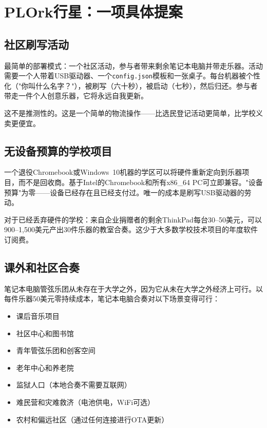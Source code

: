 \documentclass[10pt,letterpaper,twocolumn]{article}
\begin{document}
\section{PLOrk行星：一项具体提案}
\label{sec:proposal}

\subsection{社区刷写活动}

最简单的部署模式：一个社区活动，参与者带来剩余笔记本电脑并带走乐器。活动需要一个人带着USB驱动器、一个\texttt{config.json}模板和一张桌子。每台机器被个性化（"你叫什么名字？"），被刷写（六十秒），被启动（七秒），然后归还。参与者带走一件个人创意乐器，它将永远自我更新。

这不是推测性的。这是一个简单的物流操作——比选民登记活动更简单，比学校义卖更便宜。

\subsection{无设备预算的学校项目}

一个退役Chromebook或Windows~10机器的学区可以将硬件重新定向到乐器项目，而不是回收商。基于Intel的Chromebook和所有x86\_64 PC可立即兼容。"设备预算"为零——设备已经存在且已经支付过。唯一的成本是刷写USB驱动器的劳动。

对于已经丢弃硬件的学校：来自企业捐赠者的剩余ThinkPad每台30--50美元，可以900--1,500美元产出30件乐器的教室合奏。这少于大多数学校技术项目的年度软件订阅费。

\subsection{课外和社区合奏}

笔记本电脑管弦乐团从未存在于大学之外，因为它从未在大学之外经济上可行。以每件乐器50美元零持续成本，笔记本电脑合奏对以下场景变得可行：

\begin{itemize}
  \item 课后音乐项目
  \item 社区中心和图书馆
  \item 青年管弦乐团和创客空间
  \item 老年中心和养老院
  \item 监狱人口（本地合奏不需要互联网）
  \item 难民营和灾难救济（电池供电，WiFi可选）
  \item 农村和偏远社区（通过任何连接进行OTA更新）
\end{itemize}
\end{document}
